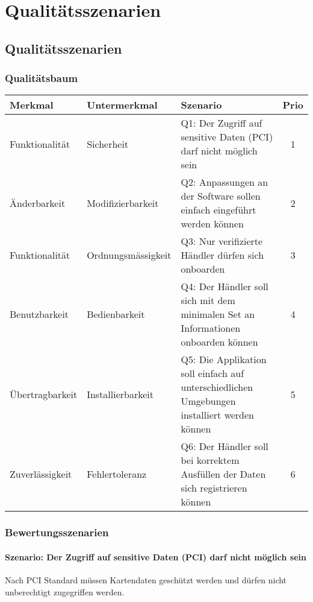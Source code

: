 \chapter{Qualitätsszenarien}
\label{sec:qualityscenarios}

\section{Qualitätsszenarien}

\subsection{Qualitätsbaum}

\begin{tabular}{l|l|l|c}
Merkmal & Untermerkmal & Szenario & Prio \\ \hline
Funktionalität & Sicherheit & Q1: Der Zugriff auf sensitive Daten (PCI) darf nicht möglich sein & 1 \\
Änderbarkeit & Modifizierbarkeit & Q2: Anpassungen an der Software sollen einfach eingeführt werden können & 2 \\
Funktionalität & Ordnungsmässigkeit & Q3: Nur verifizierte Händler dürfen sich onboarden & 3 \\
Benutzbarkeit & Bedienbarkeit & Q4: Der Händler soll sich mit dem minimalen Set an Informationen onboarden können & 4 \\
Übertragbarkeit & Installierbarkeit & Q5: Die Applikation soll einfach auf unterschiedlichen Umgebungen installiert werden können & 5 \\
Zuverlässigkeit & Fehlertoleranz & Q6: Der Händler soll bei korrektem Ausfüllen der Daten sich registrieren können & 6
\\ \hline
\end{tabular}

\subsection{Bewertungsszenarien}
\subsubsection{Szenario: Der Zugriff auf sensitive Daten (PCI) darf nicht möglich sein}
Nach PCI Standard müssen Kartendaten geschützt werden und dürfen nicht unberechtigt zugegriffen werden.
